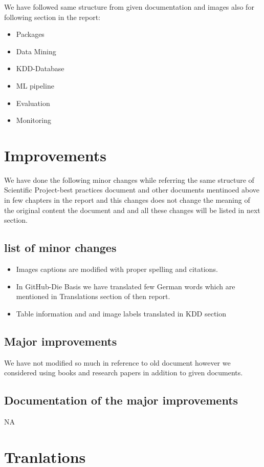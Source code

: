 		 We have followed same structure from given documentation and images
		 also for following section in the report:
		\begin{itemize}	
		\item Packages
		\item Data Mining
		\item KDD-Database
		\item ML pipeline
		\item Evaluation
		\item Monitoring
	\end{itemize}
	\section{Improvements}
	We have done the following minor changes while referring the same
	structure of Scientific Project-best practices document and other documents mentinoed above in few chapters in the report and	this changes does not change the meaning of the original content the document and and all these changes will be listed in next section.
		\subsection{list of minor changes}
		
\begin{itemize}	
	\item Images captions are modified with proper spelling and citations.
	\item In GitHub-Die Basis we have translated few German words
	which are mentioned in Translations section of then report.
	\item Table information and and image labels translated in KDD section
		\end{itemize}
	
\subsection{Major improvements}
We have not modified so much in reference to old document however
we considered using books and research papers in addition to given
documents.

\subsection{Documentation of the major improvements}
NA
	\section{Tranlations}

